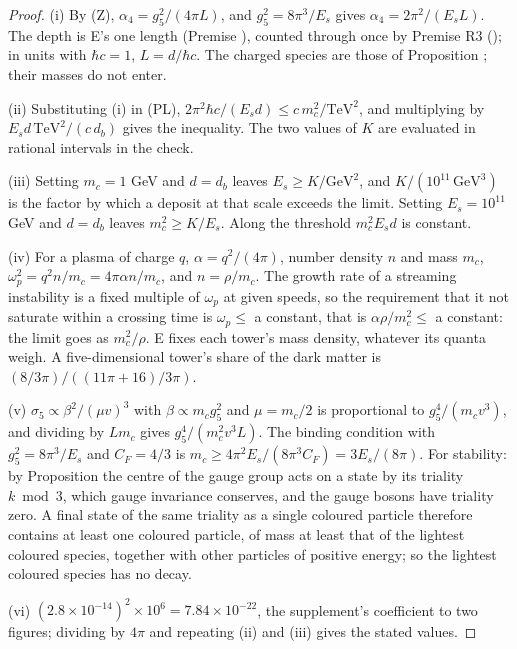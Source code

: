 \begin{proof}
(i) By (Z), $\alpha_{4} = g_{5}^{2}/(4\pi L)$, and $g_{5}^{2} = 8\pi^{3}/E_{s}$ gives $\alpha_{4} = 2\pi^{2}/(E_{s}L)$. The depth is E's one length (Premise ), counted through once by Premise R3 (); in units with $\hbar c = 1$, $L = d/\hbar c$. The charged species are those of Proposition ; their masses do not enter.

(ii) Substituting (i) in (PL), $2\pi^{2}\hbar c/(E_{s}d) \le c\,m_{c}^{2}/\mathrm{TeV}^{2}$, and multiplying by $E_{s}d\,\mathrm{TeV}^{2}/(c\,d_{b})$ gives the inequality. The two values of $K$ are evaluated in rational intervals in the check.

(iii) Setting $m_{c} = 1$ GeV and $d = d_{b}$ leaves $E_{s} \ge K/\mathrm{GeV}^{2}$, and $K/(10^{11}\,\mathrm{GeV}^{3})$ is the factor by which a deposit at that scale exceeds the limit. Setting $E_{s} = 10^{11}$ GeV and $d = d_{b}$ leaves $m_{c}^{2} \ge K/E_{s}$. Along the threshold $m_{c}^{2}E_{s}d$ is constant.

(iv) For a plasma of charge $q$, $\alpha = q^{2}/(4\pi)$, number density $n$ and mass $m_{c}$, $\omega_{p}^{2} = q^{2}n/m_{c} = 4\pi\alpha n/m_{c}$, and $n = \rho/m_{c}$. The growth rate of a streaming instability is a fixed multiple of $\omega_{p}$ at given speeds, so the requirement that it not saturate within a crossing time is $\omega_{p} \le$ a constant, that is $\alpha\rho/m_{c}^{2} \le$ a constant: the limit goes as $m_{c}^{2}/\rho$. E fixes each tower's mass density, whatever its quanta weigh. A five-dimensional tower's share of the dark matter is $(8/3\pi)/((11\pi + 16)/3\pi)$.

(v) $\sigma_{5} \propto \beta^{2}/(\mu v)^{3}$ with $\beta \propto m_{c}g_{5}^{2}$ and $\mu = m_{c}/2$ is proportional to $g_{5}^{4}/(m_{c}v^{3})$, and dividing by $Lm_{c}$ gives $g_{5}^{4}/(m_{c}^{2}v^{3}L)$. The binding condition with $g_{5}^{2} = 8\pi^{3}/E_{s}$ and $C_{F} = 4/3$ is $m_{c} \ge 4\pi^{2}E_{s}/(8\pi^{3}C_{F}) = 3E_{s}/(8\pi)$. For stability: by Proposition  the centre of the gauge group acts on a state by its triality $k \bmod 3$, which gauge invariance conserves, and the gauge bosons have triality zero. A final state of the same triality as a single coloured particle therefore contains at least one coloured particle, of mass at least that of the lightest coloured species, together with other particles of positive energy; so the lightest coloured species has no decay.

(vi) $(2.8 \times 10^{-14})^{2} \times 10^{6} = 7.84 \times 10^{-22}$, the supplement's coefficient to two figures; dividing by $4\pi$ and repeating (ii) and (iii) gives the stated values.
\end{proof}
